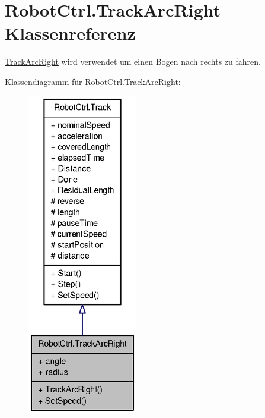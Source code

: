 \hypertarget{class_robot_ctrl_1_1_track_arc_right}{
\section{RobotCtrl.TrackArcRight Klassenreferenz}
\label{class_robot_ctrl_1_1_track_arc_right}
}


\hyperlink{class_robot_ctrl_1_1_track_arc_right}{TrackArcRight} wird verwendet um einen Bogen nach rechts zu fahren.  




Klassendiagramm für RobotCtrl.TrackArcRight:\nopagebreak
\begin{figure}[H]
\begin{center}
\leavevmode
\includegraphics[height=400pt]{class_robot_ctrl_1_1_track_arc_right__inherit__graph}
\end{center}
\end{figure}


